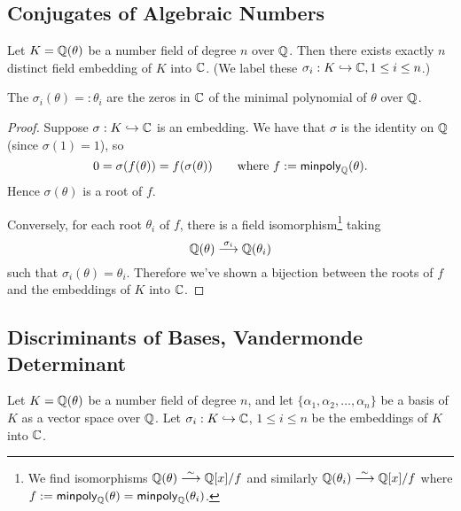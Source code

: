 \subsection{Conjugates of Algebraic Numbers}
\begin{theorem}
    Let $K = \mathbb Q(\theta)$ be a number field of degree $n$ over $\mathbb Q$. Then there exists exactly $n$ distinct field embedding of $K$ into $\mathbb C$. (We label these $\sigma_i : K \hookrightarrow \mathbb C, 1\leq i \leq n$.)

    The $\sigma_i(\theta)=:\theta_i$ are the zeros in $\mathbb C$ of the minimal polynomial of $\theta$ over $\mathbb Q$.
\end{theorem}
\begin{proof}
    Suppose $\sigma : K\hookrightarrow \mathbb C$ is an embedding. We have that $\sigma$ is the identity on $\mathbb Q$ (since $\sigma(1) = 1$), so
    \[0=\sigma(f(\theta)) = f(\sigma(\theta))\qquad \text{where $f:= \operatorname{\mathsf{minpoly}}_\mathbb Q(\theta)$}.\]
    Hence $\sigma(\theta)$ is a root of $f$.

    Conversely, for each root $\theta_i$ of $f$, there is a field isomorphism\footnote{We find isomorphisms $\mathbb Q(\theta)\overset{\sim}{\longrightarrow} \mathbb Q[x]/f$ and similarly $\mathbb Q(\theta_i)\overset{\sim}{\longrightarrow} \mathbb Q[x]/f$ where $f :=\operatorname{\mathsf{minpoly}}_\mathbb Q(\theta) = \operatorname{\mathsf{minpoly}}_\mathbb Q(\theta_i)$.} taking
    \[\mathbb Q(\theta)\overset{\sigma_i}{\longrightarrow}\mathbb Q(\theta_i)\]
    such that $\sigma_i (\theta) = \theta_i$. Therefore we've shown a bijection between the roots of $f$ and the embeddings of $K$ into $\mathbb C$.
\end{proof}

\subsection{Discriminants of Bases, Vandermonde Determinant}
Let $K = \mathbb Q(\theta)$ be a number field of degree $n$, and let $\{\alpha_1, \alpha_2, \dots, \alpha_n\}$ be a basis of $K$ as a vector space over $\mathbb Q$. Let $\sigma_i : K\hookrightarrow \mathbb C$, $1\leq i\leq n$ be the embeddings of $K$ into $\mathbb C$.

